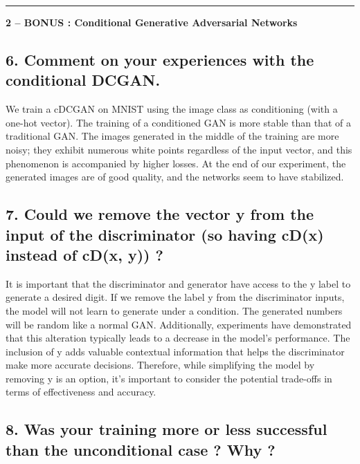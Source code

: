 \begin{center}\rule{0.5\linewidth}{0.5pt}\end{center}

\textbf{2 -- BONUS : Conditional Generative Adversarial Networks}

\hypertarget{comment-on-your-experiences-with-the-conditional-dcgan.}{%
\subsection{6. Comment on your experiences with the conditional
DCGAN.}\label{comment-on-your-experiences-with-the-conditional-dcgan.}}

We train a cDCGAN on MNIST using the image class as conditioning (with a
one-hot vector). The training of a conditioned GAN is more stable than
that of a traditional GAN. The images generated in the middle of the
training are more noisy; they exhibit numerous white points regardless
of the input vector, and this phenomenon is accompanied by higher
losses. At the end of our experiment, the generated images are of good
quality, and the networks seem to have stabilized.

\hypertarget{could-we-remove-the-vector-y-from-the-input-of-the-discriminator-so-having-cdx-instead-of-cdx-y}{%
\subsection{7. Could we remove the vector y from the input of the
discriminator (so having cD(x) instead of cD(x, y))
?}\label{could-we-remove-the-vector-y-from-the-input-of-the-discriminator-so-having-cdx-instead-of-cdx-y}}

It is important that the discriminator and generator have access to the
y label to generate a desired digit. If we remove the label y from the
discriminator inputs, the model will not learn to generate under a
condition. The generated numbers will be random like a normal GAN.
Additionally, experiments have demonstrated that this alteration
typically leads to a decrease in the model's performance. The inclusion
of y adds valuable contextual information that helps the discriminator
make more accurate decisions. Therefore, while simplifying the model by
removing y is an option, it's important to consider the potential
trade-offs in terms of effectiveness and accuracy.

\hypertarget{was-your-training-more-or-less-successful-than-the-unconditional-case-why}{%
\subsection{8. Was your training more or less successful than the
unconditional case ? Why
?}\label{was-your-training-more-or-less-successful-than-the-unconditional-case-why}}

